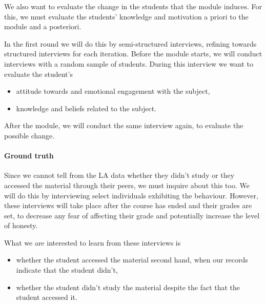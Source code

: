 We also want to evaluate the change in the students that the module induces.
For this, we must evaluate the students' knowledge and motivation a priori to 
the module and a posteriori.

In the first round we will do this by semi-structured interviews, refining 
towards structured interviews for each iteration.
Before the module starts, we will conduct interviews with a random sample of 
students.
During this interview we want to evaluate the student's
\begin{itemize}
  \item attitude towards and emotional engagement with the subject,
  \item knowledge and beliefs related to the subject.
\end{itemize}

After the module, we will conduct the same interview again, to evaluate the 
possible change.

\paragraph{Ground truth}

Since we cannot tell from the \ac{LA} data whether they didn't study or they 
accessed the material through their peers, we must inquire about this too.
We will do this by interviewing select individuals exhibiting the behaviour.
However, these interviews will take place after the course has ended and their 
grades are set, to decrease any fear of affecting their grade and potentially 
increase the level of honesty.

What we are interested to learn from these interviews is
\begin{itemize}
  \item whether the student accessed the material second hand, when our records 
    indicate that the student didn't,
  \item whether the student didn't study the material despite the fact that the 
    student accessed it.
\end{itemize}

